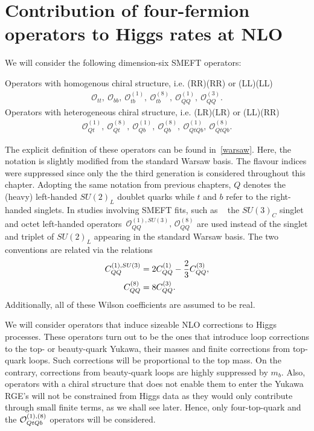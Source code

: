 \section{Contribution of four-fermion operators to Higgs rates at NLO \label{sec:HiggsCalc}}
We will consider the following dimension-six SMEFT operators:
%
\begin{tcolorbox}[title=Four-heavy-quark SMEFT operators modifying Higgs rates at NLO,
	title filled=false,
	colback=Mahogany!5!white,
	colframe=Mahogany ]
	Operators with homogenous chiral structure, i.e.  (RR)(RR) or (LL)(LL)
	\begin{align}
		\mathcal{O}_{tt},\  \mathcal{O}_{bb},\ \mathcal{O}_{tb}^{(1)}, \ \mathcal{O}_{tb}^{(8)}, \  \mathcal{O}_{QQ}^{(1)},\   \mathcal{O}_{QQ}^{(3)}.
		\label{box:heavyq}
	\end{align}
	Operators with heterogeneous chiral structure, i.e.  (LR)(LR) or (LL)(RR)
	\begin{align}
		\mathcal{O}_{Qt}^{(1)},\ \mathcal{O}_{Qt}^{(8)},\ \mathcal{O}_{Qb}^{(1)},\ \mathcal{O}_{Qb}^{(8)},\ \mathcal{O}^{(1)}_{QtQb},\ \mathcal{O}^{(8)}_{QtQb}.
		\label{box:heavyqs}
	\end{align}
\end{tcolorbox}
The explicit definition of these operators can be found in~\autoref{warsaw}. Here, the notation is slightly modified from the standard Warsaw basis. The flavour indices were suppressed since only the the third generation is considered throughout this chapter. Adopting the same notation from previous chapters, $Q$ denotes the (heavy) left-handed  $SU(2)_L$ doublet quarks while  $t$ and $b$ refer to the right-handed singlets.  In studies involving SMEFT fits, such as ~\cite{Ethier:2021bye} the $SU(3)_C$ singlet and octet left-handed operators~$\mathcal{O}_{QQ}^{(1),SU(3)},\,\mathcal{O}_{QQ}^{(8)}$ are used instead of the singlet and triplet of $SU(2)_L$ appearing in the standard Warsaw basis. The two conventions are related via the relations
\begin{align}
	C_{QQ}^{(1),SU(3)} &= 2 C_{QQ}^{(1)} -\frac{2}{3} C_{QQ}^{(3)}, \nonumber \\
	C_{QQ}^{(8)} &= 8 C_{QQ}^{(3)}.
\end{align}
Additionally, all of these Wilson coefficients are assumed to be real.\\
\par  We will consider operators that induce sizeable NLO corrections to Higgs processes. These operators turn out to be the ones that introduce loop corrections to the top- or beauty-quark Yukawa, their masses and finite corrections from top-quark loops. Such corrections will be proportional to the top mass. On the contrary, corrections from beauty-quark loops are highly suppressed by $m_b$.  Also, operators with a chiral structure that does not enable them to enter the Yukawa RGE's will not be constrained from Higgs data as they would only contribute through small finite terms, as we shall see later.  Hence, only four-top-quark and the  ${\cal O}_{QtQb}^{(1),(8)}$ operators will be considered.

